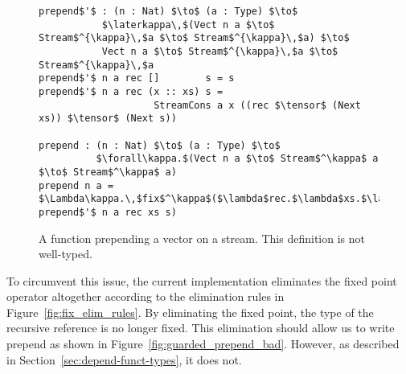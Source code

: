 \begin{figure}[h]
\begin{lstlisting}[mathescape,title=\ttBlock]
prepend$'$ : (n : Nat) $\to$ (a : Type) $\to$
           $\laterkappa\,$(Vect n a $\to$ Stream$^{\kappa}\,$a $\to$ Stream$^{\kappa}\,$a) $\to$ 
           Vect n a $\to$ Stream$^{\kappa}\,$a $\to$ Stream$^{\kappa}\,$a
prepend$'$ n a rec []        s = s 
prepend$'$ n a rec (x :: xs) s = 
                    StreamCons a x ((rec $\tensor$ (Next xs)) $\tensor$ (Next s))

prepend : (n : Nat) $\to$ (a : Type) $\to$ 
          $\forall\kappa.$(Vect n a $\to$ Stream$^\kappa$ a $\to$ Stream$^\kappa$ a)
prepend n a = $\Lambda\kappa.\,$fix$^\kappa$($\lambda$rec.$\lambda$xs.$\lambda$s. prepend$'$ n a rec xs s)
\end{lstlisting}
  \caption{A function prepending a vector on a stream. This definition is not well-typed.}
  \label{fig:guarded_prepend}
\end{figure}

To circumvent this issue, the current implementation eliminates the fixed point operator altogether according
to the elimination rules in Figure~\ref{fig:fix_elim_rules}. By eliminating the
fixed point, the type of the recursive reference is no longer fixed. This
elimination should allow us to write prepend as shown in
Figure~\ref{fig:guarded_prepend_bad}. However, as described in
Section~\ref{sec:depend-funct-types}, it does not.



